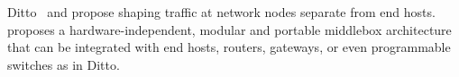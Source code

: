 
Ditto~\cite{meier2022ditto} and {\sys} propose shaping traffic at network nodes
separate from end hosts.
{\sys} proposes a hardware-independent, modular and portable
middlebox architecture that can be integrated with end hosts, routers,
gateways, or even programmable switches as in Ditto.


